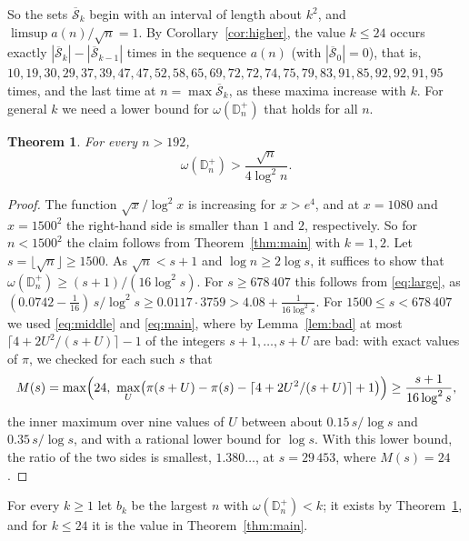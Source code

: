 \documentclass[11pt]{amsart}
\newtheorem{theorem}{Theorem}
\theoremstyle{remark}
\numberwithin{equation}{section}
\newcommand{\Dp}{\mathbb D^{+}}
\newcommand{\fl}[1]{\lfloor #1\rfloor}
\newcommand{\Sb}{\overline{\mathcal S}}
\begin{document}
So the sets $\Sb_k$ begin with an interval of length about $k^2$, and $\limsup a(n)/\sqrt n=1$. By Corollary~\ref{cor:higher}, the
value $k\le24$ occurs exactly $|\Sb_k|-|\Sb_{k-1}|$ times in the sequence $a(n)$ (with $|\Sb_0|=0$), that is,
$10,19,30,29,37,39,47,47,52,58,65,69,72,72,74,75,79,83,91,85,92,92,91,95$ times, and the last time at $n=\max\Sb_k$, as these maxima
increase with $k$. For general $k$ we need a lower bound for $\omega(\Dp_n)$ that holds for all $n$.

\begin{theorem}\label{thm:explicit}
For every $n>192$,
\[
\omega(\Dp_n)>\frac{\sqrt n}{4\log^2n}.
\]
\end{theorem}
\begin{proof}
The function $\sqrt x/\log^2x$ is increasing for $x>e^4$, and at $x=1080$ and $x=1500^2$ the right-hand side is smaller than $1$
and $2$, respectively. So for $n<1500^2$ the claim follows from Theorem~\ref{thm:main} with $k=1,2$. Let $s=\fl{\sqrt n}\ge1500$.
As $\sqrt n<s+1$ and $\log n\ge2\log s$, it suffices to show that $\omega(\Dp_n)\ge(s+1)/(16\log^2s)$. For $s\ge678\,407$ this follows
from \eqref{eq:large}, as $(0.0742-\frac1{16})\,s/\log^2s\ge0.0117\cdot3759>4.08+\frac1{16\log^2s}$. For $1500\le s<678\,407$ we used
\eqref{eq:middle} and \eqref{eq:main}, where by Lemma~\ref{lem:bad} at most $\lceil4+2U^2/(s+U)\rceil-1$ of the integers
$s+1,\dots,s+U$ are bad: with exact values of $\pi$, we checked for each such $s$ that
\[
M(s)=\max\Bigl(24,\ \max_U\bigl(\pi(s+U)-\pi(s)-\lceil4+2U^2/(s+U)\rceil+1\bigr)\Bigr)\ge\frac{s+1}{16\log^2s},
\]
the inner maximum over nine values of $U$ between about $0.15\,s/\log s$ and $0.35\,s/\log s$, and with a rational lower bound for
$\log s$. With this lower bound, the ratio of the two sides is smallest, $1.380\ldots$, at $s=29\,453$, where $M(s)=24$.
\end{proof}

For every $k\ge1$ let $b_k$ be the largest $n$ with $\omega(\Dp_n)<k$; it exists by Theorem~\ref{thm:explicit}, and for $k\le24$ it is
the value in Theorem~\ref{thm:main}.
\end{document}
